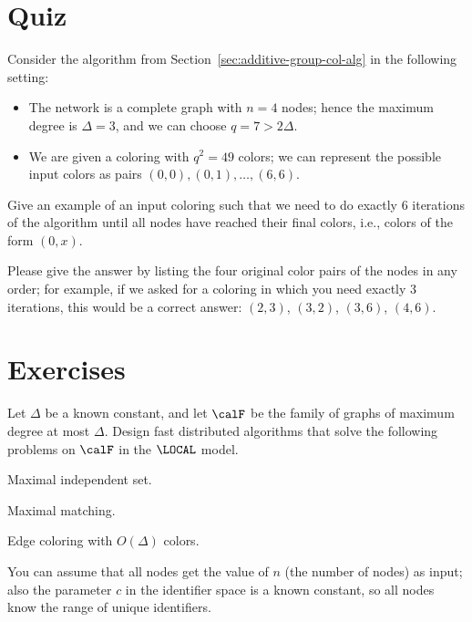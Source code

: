 \section{Quiz}

Consider the algorithm from Section~\ref{sec:additive-group-col-alg} in the following setting:
\begin{itemize}[noitemsep]
    \item The network is a complete graph with $n = 4$ nodes; hence the maximum degree is $\Delta = 3$, and we can choose $q = 7 > 2\Delta$.
    \item We are given a coloring with $q^2 = 49$ colors; we can represent the possible input colors as pairs $(0,0),\allowbreak (0,1),\allowbreak \dotsc,\allowbreak (6,6)$.
\end{itemize}
Give an example of an input coloring such that we need to do exactly $6$ iterations of the algorithm until all nodes have reached their final colors, i.e., colors of the form $(0,x)$.

Please give the answer by listing the four original color pairs of the nodes in any order; for example, if we asked for a coloring in which you need exactly 3 iterations, this would be a correct answer: $(2, 3)$, $(3, 2)$, $(3, 6)$, $(4, 6)$.

\section{Exercises}

\begin{ex}[applications]
    Let $\Delta$ be a known constant, and let $\calF$ be the family of graphs of maximum degree at most $\Delta$. Design fast distributed algorithms that solve the following problems on $\calF$ in the $\LOCAL$ model.
    \begin{subex}
        \item Maximal independent set.
        \item Maximal matching.
        \item Edge coloring with $O(\Delta)$ colors.
    \end{subex}
    You can assume that all nodes get the value of $n$ (the number of nodes) as input; also the parameter $c$ in the identifier space is a known constant, so all nodes know the range of unique identifiers.
\end{ex}

